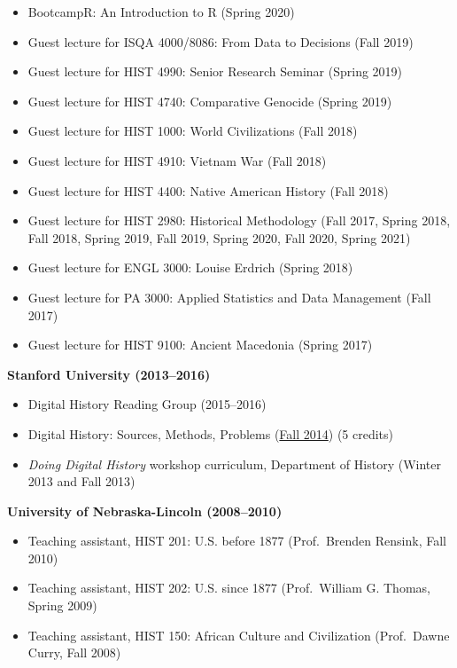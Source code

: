 \begin{itemize}
\tightlist
\item
  BootcampR: An Introduction to R (Spring 2020)
\item
  Guest lecture for ISQA 4000/8086: From Data to Decisions (Fall 2019)
\item
  Guest lecture for HIST 4990: Senior Research Seminar (Spring 2019)
\item
  Guest lecture for HIST 4740: Comparative Genocide (Spring 2019)
\item
  Guest lecture for HIST 1000: World Civilizations (Fall 2018)
\item
  Guest lecture for HIST 4910: Vietnam War (Fall 2018)
\item
  Guest lecture for HIST 4400: Native American History (Fall 2018)
\item
  Guest lecture for HIST 2980: Historical Methodology (Fall 2017, Spring
  2018, Fall 2018, Spring 2019, Fall 2019, Spring 2020, Fall 2020,
  Spring 2021)
\item
  Guest lecture for ENGL 3000: Louise Erdrich (Spring 2018)
\item
  Guest lecture for PA 3000: Applied Statistics and Data Management
  (Fall 2017)
\item
  Guest lecture for HIST 9100: Ancient Macedonia (Spring 2017)
\end{itemize}

\textbf{Stanford University (2013--2016)}

\begin{itemize}
\tightlist
\item
  Digital History Reading Group (2015--2016)
\item
  Digital History: Sources, Methods, Problems
  (\href{http://jasonheppler.org/teaching/hist205f.2014/}{Fall 2014}) (5
  credits)
\item
  \emph{Doing Digital History} workshop curriculum, Department of
  History (Winter 2013 and Fall 2013)
\end{itemize}

\textbf{University of Nebraska-Lincoln (2008--2010)}

\begin{itemize}
\tightlist
\item
  Teaching assistant, HIST 201: U.S. before 1877 (Prof.~Brenden Rensink,
  Fall 2010)
\item
  Teaching assistant, HIST 202: U.S. since 1877 (Prof.~William G.
  Thomas, Spring 2009)
\item
  Teaching assistant, HIST 150: African Culture and Civilization
  (Prof.~Dawne Curry, Fall 2008)
\end{itemize}

